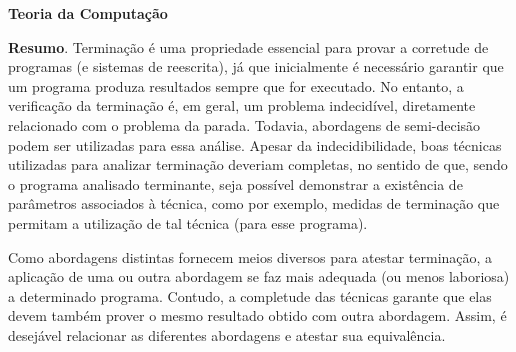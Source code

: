 
\pagestyle{fancy}

\lhead{}
\rhead{}


\renewcommand{\headrulewidth}{0.4pt}
\renewcommand{\footrulewidth}{0.4pt}


\begin{center}
	\huge{{\bf Teoria da Computa\c{c}\~{a}o}}
	\vspace{1cm}
\end{center}

%	
%	
	\noindent\textbf{Resumo}.\label{aaa} 
	Terminação é uma propriedade essencial para provar a corretude de programas (e sistemas de reescrita), já que inicialmente é necessário garantir que um programa produza resultados sempre que for executado. No entanto, a verificação da terminação é, em geral, um problema indecidível, diretamente relacionado com o problema da parada. Todavia, abordagens de semi-decisão podem ser utilizadas para essa análise. Apesar da indecidibilidade, boas técnicas utilizadas para analizar terminação deveriam completas, no sentido de que, sendo o programa analisado terminante, seja possível demonstrar a existência de parâmetros associados à técnica, como por exemplo, medidas de terminação que permitam a utilização de tal técnica (para esse programa).

Como abordagens distintas fornecem meios diversos para atestar terminação, a aplicação de uma ou outra abordagem se faz mais adequada (ou menos laboriosa) a determinado programa. Contudo, a completude das técnicas garante que elas devem também prover o mesmo resultado obtido com outra abordagem. Assim, é desejável relacionar as diferentes abordagens e atestar sua equivalência.

